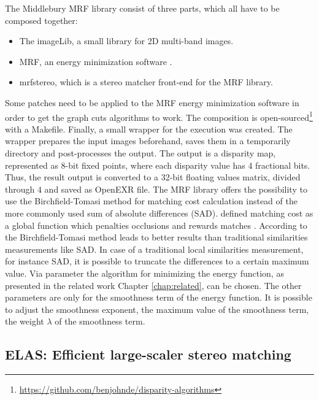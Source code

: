 The Middlebury MRF library \citep{scharstein2006middlebury} consist of three parts, which all have to be composed together:
\begin{itemize}
  \item The imageLib, a small library for 2D multi-band images.
  \item MRF, an energy minimization software \citep{szeliski2008comparative}.
  \item mrfstereo, which is a stereo matcher front-end for the MRF library.
\end{itemize}

\noindent Some patches need to be applied to the MRF energy minimization software in order to get the graph cuts algorithms to work.
The composition is open-sourced\footnote{\url{https://github.com/benjohnde/disparity-algorithms}} with a Makefile.
Finally, a small wrapper for the execution was created.
The wrapper prepares the input images beforehand, saves them in a temporarily directory and post-processes the output.
The output is a disparity map, represented as 8-bit fixed points, where each disparity value has 4 fractional bits.
Thus, the result output is converted to a 32-bit floating values matrix, divided through $4$ and saved as OpenEXR file.
\newline\newline\noindent The MRF library offers the possibility to use the Birchfield-Tomasi method for matching cost calculation instead of the more commonly used sum of absolute differences (SAD).
\citeauthor{birchfield1999depth} defined matching cost as a global function which penalties occlusions and rewards matches \citep{birchfield1999depth}.
According to \citep{scharstein2002taxonomy, hirschmuller2007evaluation} the Birchfield-Tomasi method leads to better results than traditional similarities measurements like SAD.
In case of a traditional local similarities measurement, for instance SAD, it is possible to truncate the differences to a certain maximum value.
Via parameter the algorithm for minimizing the energy function, as presented in the related work Chapter \ref{chap:related}, can be chosen.
The other parameters are only for the smoothness term of the energy function.
It is possible to adjust the smoothness exponent, the maximum value of the smoothness term, the weight $\lambda$ of the smoothness term.

\subsection*{ELAS: Efficient large-scaler stereo matching}

